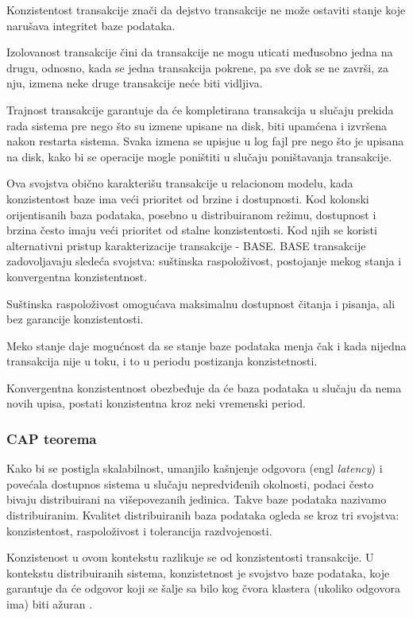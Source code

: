 \documentclass[12pt,oneside]{memoir}
\begin{document}
Konzistentost transakcije znači da dejstvo transakcije ne može ostaviti stanje koje narušava integritet baze podataka.

Izolovanost transakcije čini da transakcije ne mogu uticati međusobno jedna na drugu, odnosno, kada se jedna transakcija pokrene, pa sve dok se ne završi, za nju, izmena neke druge transakcije neće biti vidljiva.

Trajnost transakcije garantuje da će kompletirana transakcija u slučaju prekida rada sistema pre nego što su izmene upisane na disk, biti upamćena i izvršena nakon restarta sistema. Svaka izmena se upisjue u log fajl pre nego što je upisana na disk, kako bi se operacije mogle poništiti u slučaju poništavanja transakcije.

Ova svojstva obično karakterišu transakcije u relacionom modelu, kada konzistentost baze ima veći prioritet od brzine i dostupnosti. Kod kolonski orijentisanih baza podataka, posebno u distribuiranom režimu, dostupnost i brzina često imaju veći prioritet od stalne konzistentosti. Kod njih se koristi alternativni pristup karakterizacije transakcije - BASE. BASE transakcije zadovoljavaju sledeća svojstva: suštinska raspoloživost, postojanje mekog stanja i konvergentna konzistentnost.

Suštinska raspoloživost omogućava maksimalnu dostupnost čitanja i pisanja, ali bez garancije konzistentosti.

Meko stanje daje mogućnost da se stanje baze podataka menja čak i kada nijedna transakcija nije u toku, i to u periodu postizanja konzistetnosti.

Konvergentna konzistentnost obezbeđuje da će baza podataka u slučaju da nema novih upisa, postati konzistentna kroz neki vremenski period. 

\subsubsection{CAP teorema}

Kako bi se postigla skalabilnost, umanjilo kašnjenje odgovora (engl \textit{latency}) i povećala dostupnos sistema u slučaju nepredviđenih okolnosti, podaci često bivaju distribuirani na višepovezanih jedinica. Takve baze podataka nazivamo distribuiranim. 
Kvalitet distribuiranih baza podataka ogleda se kroz tri svojstva: konzistentost, raspoloživost i tolerancija razdvojenosti.

Konzistenost u ovom kontekstu razlikuje se od konzistentosti transakcije. U kontekstu distribuiranih sistema, konzistetnost je svojstvo baze podataka, koje garantuje da će odgovor koji se šalje sa bilo kog čvora klastera (ukoliko odgovora ima) biti ažuran .
\end{document}
